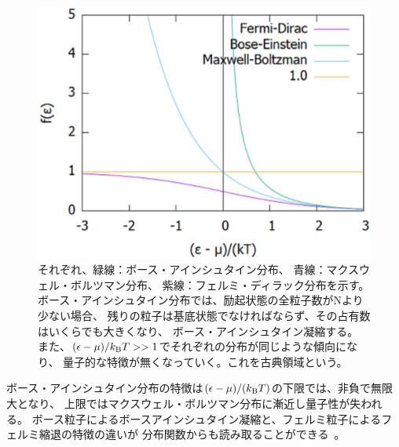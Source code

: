 \documentclass[12pt,a4paper]{jbook}
\newcommand{\kb} {k_{\rm B}}				%
\begin{document}
		\begin{figure}[H]
			\centering
			\includegraphics[width=14cm]{dist.eps}
			\caption{
			それぞれ、緑線：ボース・アインシュタイン分布、
			青線：マクスウェル・ボルツマン分布、
			紫線：フェルミ・ディラック分布を示す。
            		ボース・アインシュタイン分布では、励起状態の全粒子数がNより少ない場合、
            		残りの粒子は基底状態でなければならず、その占有数はいくらでも大きくなり、
            		ボース・アインシュタイン凝縮する。
            		また、$(\epsilon - \mu)/{\kb T}>>1$でそれぞれの分布が同じような傾向になり、
            		量子的な特徴が無くなっていく。これを古典領域という。
			}
			\label{FIG:bose}
		\end{figure}
		ボース・アインシュタイン分布の特徴は$(\epsilon - \mu) / (\kb T)$の下限では、非負で無限大となり、
        	上限ではマクスウェル・ボルツマン分布に漸近し量子性が失われる。
        	ボース粒子によるボースアインシュタイン凝縮と、フェルミ粒子によるフェルミ縮退の特徴の違いが
        	分布関数からも読み取ることができる~\cite{Pauli}。
\end{document}
